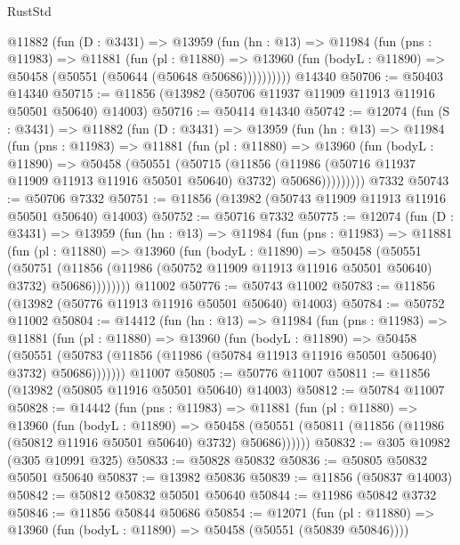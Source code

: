 \begin{lexlean}{RustStd}
\begin{coremodule}
      @11882
        (fun (D : @3431) =>
        @13959
          (fun (hn : @13) =>
          @11984
            (fun (pns : @11983) =>
            @11881
              (fun (pl : @11880) =>
              @13960 (fun (bodyL : @11890) => @50458 (@50551 (@50644 (@50648 @50686))))))))))
    @14340
@50706 := @50403 @14340
@50715 := @11856 (@13982 (@50706 @11937 @11909 @11913 @11916 @50501 @50640) @14003)
@50716 := @50414 @14340
@50742 := @12074
    (fun (S : @3431) =>
    @11882
      (fun (D : @3431) =>
      @13959
        (fun (hn : @13) =>
        @11984
          (fun (pns : @11983) =>
          @11881
            (fun (pl : @11880) =>
            @13960
              (fun (bodyL : @11890) =>
              @50458
                (@50551
                  (@50715
                    (@11856
                      (@11986 (@50716 @11937 @11909 @11913 @11916 @50501 @50640) @3732)
                      @50686)))))))))
    @7332
@50743 := @50706 @7332
@50751 := @11856 (@13982 (@50743 @11909 @11913 @11916 @50501 @50640) @14003)
@50752 := @50716 @7332
@50775 := @12074
    (fun (D : @3431) =>
    @13959
      (fun (hn : @13) =>
      @11984
        (fun (pns : @11983) =>
        @11881
          (fun (pl : @11880) =>
          @13960
            (fun (bodyL : @11890) =>
            @50458
              (@50551
                (@50751
                  (@11856 (@11986 (@50752 @11909 @11913 @11916 @50501 @50640) @3732) @50686))))))))
    @11002
@50776 := @50743 @11002
@50783 := @11856 (@13982 (@50776 @11913 @11916 @50501 @50640) @14003)
@50784 := @50752 @11002
@50804 := @14412
    (fun (hn : @13) =>
    @11984
      (fun (pns : @11983) =>
      @11881
        (fun (pl : @11880) =>
        @13960
          (fun (bodyL : @11890) =>
          @50458
            (@50551
              (@50783 (@11856 (@11986 (@50784 @11913 @11916 @50501 @50640) @3732) @50686)))))))
    @11007
@50805 := @50776 @11007
@50811 := @11856 (@13982 (@50805 @11916 @50501 @50640) @14003)
@50812 := @50784 @11007
@50828 := @14442
    (fun (pns : @11983) =>
    @11881
      (fun (pl : @11880) =>
      @13960
        (fun (bodyL : @11890) =>
        @50458 (@50551 (@50811 (@11856 (@11986 (@50812 @11916 @50501 @50640) @3732) @50686))))))
@50832 := @305 @10982 (@305 @10991 @325)
@50833 := @50828 @50832
@50836 := @50805 @50832 @50501 @50640
@50837 := @13982 @50836
@50839 := @11856 (@50837 @14003)
@50842 := @50812 @50832 @50501 @50640
@50844 := @11986 @50842 @3732
@50846 := @11856 @50844 @50686
@50854 := @12071
    (fun (pl : @11880) => @13960 (fun (bodyL : @11890) => @50458 (@50551 (@50839 @50846))))

\end{coremodule}
\end{lexlean}
